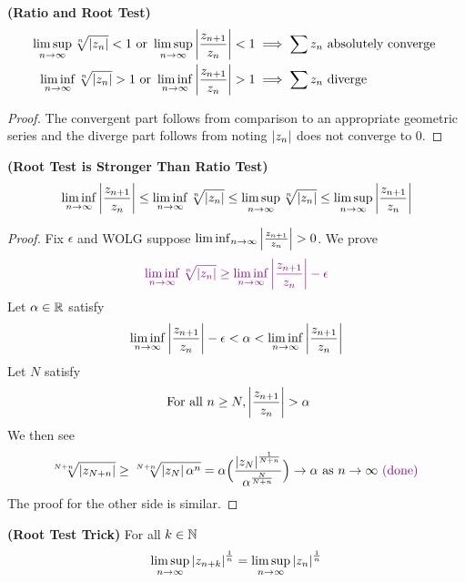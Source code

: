 \documentclass{report}
\begin{document}
\begin{theorem}
\label{Ratio and Root Test}
\textbf{(Ratio and Root Test)} 
\begin{align*}
  \limsup_{n\to\infty} \sqrt[n]{\abso{z_n}}<1 \text{ or }\limsup_{n\to\infty} \abso{\frac{z_{n+1}}{z_n}}<1&\implies \sum z_n\text{ absolutely converge }\\
  \liminf_{n\to\infty} \sqrt[n]{\abso{z_n}}>1\text{ or }\liminf_{n\to\infty} \abso{\frac{z_{n+1}}{z_n}}>1 &\implies \sum  z_n\text{ diverge }
\end{align*}
\end{theorem}
\begin{proof}
The convergent part follows from comparison to an appropriate geometric series and the diverge part follows from noting $\left|z_n\right|$ does not converge to $0$.
\end{proof}
\begin{theorem}
\label{Root Test is Stronger Than Ratio Test}
\textbf{(Root Test is Stronger Than Ratio Test)}
\begin{align*}
\liminf_{n\to\infty} \left|\frac{z_{n+1}}{z_n}\right|\leq \liminf_{n\to\infty} \sqrt[n]{\left|z_n\right|} \leq \limsup_{n\to\infty} \sqrt[n]{\left|z_n\right|} \leq \limsup_{n\to\infty} \left|\frac{z_{n+1}}{z_n}\right|
\end{align*}
\end{theorem}
\begin{proof}
Fix $\epsilon $ and WOLG suppose $\liminf_{n\to\infty} \abso{\frac{z_{n+1}}{z_n}}>0$. We prove 
\begin{align*}
  \textcolor{violet}{\liminf_{n\to\infty} \sqrt[n]{\left|z_n\right|}\geq \liminf_{n\to\infty} \left|\frac{z_{n+1}}{z_n}\right|-\epsilon  }
\end{align*}
Let $\alpha \in\mathbb{R} $ satisfy 
\begin{align*}
\liminf_{n\to\infty}  \left|\frac{z_{n+1}}{z_n}\right|-\epsilon <\alpha < \liminf_{n\to\infty} \left|\frac{z_{n+1}}{z_n}\right|
\end{align*}
Let $N$ satisfy  
\begin{align*}
\text{ For all }n\geq N,\abso{\frac{z_{n+1}}{z_n}}>\alpha  
\end{align*}
We then see 
\begin{align*}
  \sqrt[N+n]{\left|z_{N+n}\right|}\geq \sqrt[N+n]{\left|z_N\right|\alpha^n}=\alpha \Big(\frac{\left|z_N\right|^{\frac{1}{N+n}}}{\alpha ^{\frac{N}{N+n}}} \Big)\to \alpha \text{ as }n\to \infty \textcolor{violet}{\text{ (done) }}
\end{align*}
The proof for the other side is similar.
\end{proof}
\begin{theorem}
\label{Root Test Trick}
\textbf{(Root Test Trick)} For all $k\in\mathbb{N}$ 
\begin{align*}
\limsup_{n\to\infty} \left|z_{n+k}\right|^{\frac{1}{n}}=\limsup_{n\to\infty} \left|z_n\right|^{\frac{1}{n}}
\end{align*}
\end{theorem}
\end{document}
